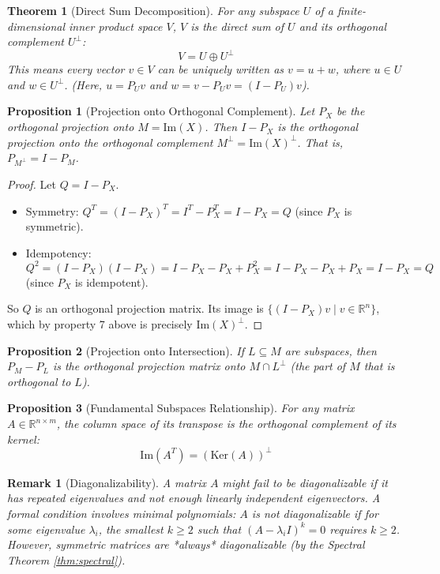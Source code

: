 \documentclass[11pt, a4paper]{article}
\theoremstyle{mydefinitionstyle}
\newtheorem{remark}{Remark}[section]
\theoremstyle{mytheoremstyle}
\newtheorem{theorem}{Theorem}[section]
\newtheorem{proposition}{Proposition}[section]
\newcommand{\R}{\mathbb{R}}
\newcommand{\Ker}{\text{Ker}}
\newcommand{\im}{\text{Im}} %
\begin{document}
\begin{theorem}[Direct Sum Decomposition] \label{thm:direct_sum}
    For any subspace $U$ of a finite-dimensional inner product space $V$, $V$ is the direct sum of $U$ and its orthogonal complement $U^\perp$:
    \[ V = U \oplus U^\perp \]
    This means every vector $v \in V$ can be uniquely written as $v = u + w$, where $u \in U$ and $w \in U^\perp$. (Here, $u = P_U v$ and $w = v - P_U v = (I-P_U)v$).
\end{theorem}

\begin{proposition}[Projection onto Orthogonal Complement] \label{prop:proj_complement}
    Let $P_X$ be the orthogonal projection onto $M = \im(X)$. Then $I - P_X$ is the orthogonal projection onto the orthogonal complement $M^\perp = \im(X)^\perp$. That is, $P_{M^\perp} = I - P_M$.
\end{proposition}
\begin{proof}
    Let $Q = I - P_X$.
    \begin{itemize}
        \item Symmetry: $Q^T = (I - P_X)^T = I^T - P_X^T = I - P_X = Q$ (since $P_X$ is symmetric).
        \item Idempotency: $Q^2 = (I - P_X)(I - P_X) = I - P_X - P_X + P_X^2 = I - P_X - P_X + P_X = I - P_X = Q$ (since $P_X$ is idempotent).
    \end{itemize}
    So $Q$ is an orthogonal projection matrix. Its image is $\{ (I-P_X)v \mid v \in \R^n \}$, which by property 7 above is precisely $\im(X)^\perp$.
\end{proof}

\begin{proposition}[Projection onto Intersection] \label{prop:proj_intersection}
    If $L \subseteq M$ are subspaces, then $P_M - P_L$ is the orthogonal projection matrix onto $M \cap L^\perp$ (the part of $M$ that is orthogonal to $L$).
\end{proposition}

\begin{proposition}[Fundamental Subspaces Relationship] \label{prop:fund_subspaces}
    For any matrix $A \in \R^{n \times m}$, the column space of its transpose is the orthogonal complement of its kernel:
    \[ \im(A^T) = (\Ker(A))^\perp \]
\end{proposition}

\begin{remark}[Diagonalizability] \label{rem:diagonalizability}
    A matrix $A$ might fail to be diagonalizable if it has repeated eigenvalues and not enough linearly independent eigenvectors. A formal condition involves minimal polynomials: $A$ is not diagonalizable if for some eigenvalue $\lambda_i$, the smallest $k \ge 2$ such that $(A - \lambda_i I)^k = 0$ requires $k \ge 2$. However, symmetric matrices are *always* diagonalizable (by the Spectral Theorem \ref{thm:spectral}).
\end{remark}
\end{document}
